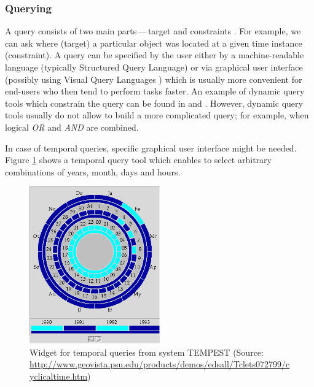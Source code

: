 \documentclass[a4paper,12pt,oneside]{book}
\newcommand{\dash}{\mbox{\,---\,}}
\begin{document}
\subsubsection{Querying}
A query consists of two main parts\dash target and constraints \cite{andrienko2003exploratory}.
For example, we can ask where (target) a particular object was located at a given time instance (constraint).
A query can be specified by the user either by a machine-readable language (typically Structured Query Language)
or via graphical user interface (possibly using Visual Query Languages \cite{catarci1997visual})
which is usually more convenient for end-users who then tend to perform tasks faster.
An example of dynamic query tools which constrain the query can be found
in \cite{ahlberg1992dynamic} and \cite{hochheiser2004dynamic}.
However, dynamic query tools usually do not allow to build a more complicated query;
for example, when logical \emph{OR} and \emph{AND} are combined.


In case of temporal queries, specific graphical user interface
might be needed. Figure \ref{fig:cyclical_time} shows a temporal query tool
which enables to select arbitrary combinations of years, month, days and hours.


\begin{figure}[h!]
  \centering
  \includegraphics[width=0.5\textwidth]{./images/cyclical_time.png}
  \caption[Widget for temporal queries from system TEMPEST]
        {Widget for temporal queries from system TEMPEST (Source:
      \url{http://www.geovista.psu.edu/products/demos/edsall/Tclets072799/cyclicaltime.htm})}
  \label{fig:cyclical_time}
\end{figure}
\end{document}
